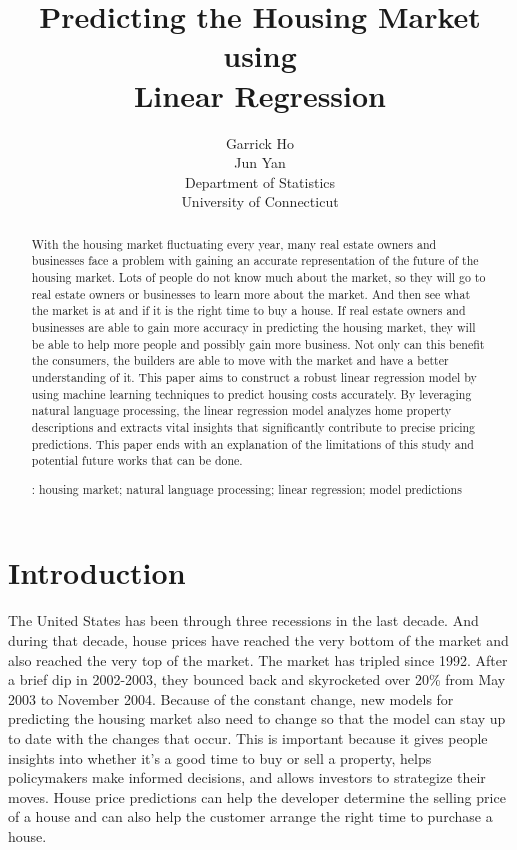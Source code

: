 \documentclass[12pt]{article}
\title{Predicting the Housing Market using \\ Linear Regression}
\author{Garrick Ho\\
  Jun Yan\\[1ex]
  Department of Statistics\\
  University of Connecticut\\
}
\begin{document}
\maketitle
\doublespace

\begin{abstract}
With the housing market fluctuating every year, many real estate owners and businesses face a problem with gaining an accurate representation of the future of the housing market. Lots of people do not know much about the market, so they will go to real estate owners or businesses to learn more about the market. And then see what the market is at and if it is the right time to buy a house. If real estate owners and businesses are able to gain more accuracy in predicting the housing market, they will be able to help more people and possibly gain more business. Not only can this benefit the consumers, the builders are able to move with the market and have a better understanding of it. This paper aims to construct a robust linear regression model by using machine learning techniques to predict housing costs accurately. By leveraging natural language processing, the linear regression model analyzes home property descriptions and extracts vital insights that significantly contribute to precise pricing predictions. This paper ends with an explanation of the limitations of this study and potential future works that can be done.

\bigskip
{}:
housing market;
natural language processing;
linear regression;
model predictions


\end{abstract}

\section{Introduction}
\label{sec:intro}


The United States has been through three recessions in the last decade. And during that decade, house prices have reached the very bottom of the market and also reached the very top of the market. The market has tripled since 1992. After a brief dip in 2002-2003, they bounced back and skyrocketed over 20\% from May 2003 to November 2004. \cite{Jacobsen2005} Because of the constant change, new models for predicting the housing market also need to change so that the model can stay up to date with the changes that occur. This is important because it gives people insights into whether it's a good time to buy or sell a property, helps policymakers make informed decisions, and allows investors to strategize their moves. House price predictions can help the developer determine the selling price of a house and can also help the customer arrange the right time to purchase a house. \cite{alfiyantin2017} 
\end{document}
